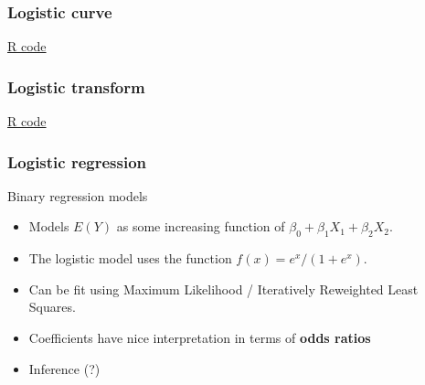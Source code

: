 \documentclass[handout]{beamer}
\begin{document}
   \begin{frame}
   \frametitle{Logistic curve}
   \begin{center}
   \end{center}
   \href{http://stats191.stanford.edu/logistic.html#logistic-transform}{R code}
   \end{frame}



   \begin{frame}
   \frametitle{Logistic transform}
   \begin{center}
   \end{center}
   \href{http://stats191.stanford.edu/logistic.html#logistic-transform}{R code}
   \end{frame}


   \begin{frame} \frametitle{Logistic regression}

   \begin{block}
     {Binary regression models}

       \begin{itemize}

       \item Models $E(Y)$ as some increasing function of
   $\beta_0 + \beta_1 X_1 + \beta_2 X_2$.
     \item The logistic
   model uses the function $f(x)=e^x/(1+e^x)$.

       \item Can be fit using Maximum Likelihood / Iteratively Reweighted Least Squares.


       \item Coefficients have nice interpretation in terms of {\bf odds ratios}
       \item Inference (?)
   \end{itemize}
   \end{block}
   \end{frame}

\end{document}
